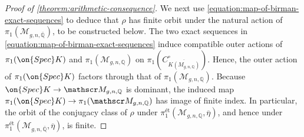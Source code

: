 \begin{proof}[Proof of \autoref{theorem:arithmetic-consequence}]
We next use \eqref{equation:map-of-birman-exact-sequences} to deduce that
$\rho$ has finite orbit under the natural action of $\pi_1(\mathscr
M_{g,n,\mathbb \overline{\mathbb Q}})$, to be constructed below.
	The two exact sequences in
	\eqref{equation:map-of-birman-exact-sequences} induce compatible outer actions of
	$\pi_1(\on{Spec} K)$ and $\pi_1(\mathscr
	M_{g,n,\mathbb Q})$ on
	$\pi_1(C^\circ_{\overline {K(M_{g,n,\mathbb Q})}})$.
	Hence, the outer action of
	$\pi_1(\on{Spec} K)$ factors through that of $\pi_1(\mathscr
	M_{g,n,\mathbb Q})$.
	Because $\on{Spec} K \to \mathscr
	M_{g,n,\mathbb Q}$ is dominant, the induced map
$\pi_1(\on{Spec} K) \to \pi_1(\mathscr M_{g,n,\mathbb Q})$ has image of finite
index.
In particular, the orbit of the conjugacy class of $\rho$ under
$\pi_1^{\text{\'et}}(\mathscr{M}_{g,n, \mathbb{Q}}, \overline{\eta})$,
and hence under $\pi_1^{\text{\'et}}(\mathscr{M}_{g,n,
\overline{\mathbb{Q}}}, \overline{\eta})$, is finite.


\end{proof}
